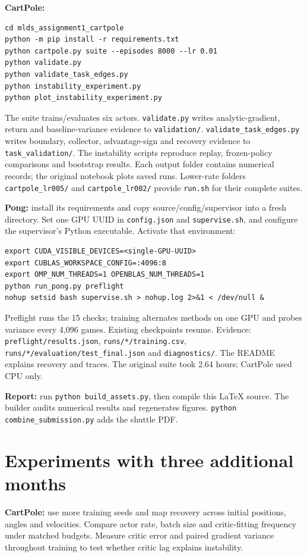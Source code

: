 \documentclass[11pt,letterpaper]{article}
\begin{document}
\textbf{CartPole:}
\begin{verbatim}
cd mlds_assignment1_cartpole
python -m pip install -r requirements.txt
python cartpole.py suite --episodes 8000 --lr 0.01
python validate.py
python validate_task_edges.py
python instability_experiment.py
python plot_instability_experiment.py
\end{verbatim}
The suite trains/evaluates six actors. \texttt{validate.py} writes analytic-gradient, return and baseline-variance evidence to \texttt{validation/}. \texttt{validate\_task\_edges.py} writes boundary, collector, advantage-sign and recovery evidence to \texttt{task\_validation/}. The instability scripts reproduce replay, frozen-policy comparisons and bootstrap results. Each output folder contains numerical records; the original notebook plots saved runs. Lower-rate folders \texttt{cartpole\_lr005/} and \texttt{cartpole\_lr002/} provide \texttt{run.sh} for their complete suites.

\textbf{Pong:} install its requirements and copy source/config/supervisor into a fresh directory. Set one GPU UUID in \texttt{config.json} and \texttt{supervise.sh}, and configure the supervisor's Python executable. Activate that environment:
\begin{verbatim}
export CUDA_VISIBLE_DEVICES=<single-GPU-UUID>
export CUBLAS_WORKSPACE_CONFIG=:4096:8
export OMP_NUM_THREADS=1 OPENBLAS_NUM_THREADS=1
python run_pong.py preflight
nohup setsid bash supervise.sh > nohup.log 2>&1 < /dev/null &
\end{verbatim}
Preflight runs the 15 checks; training alternates methods on one GPU and probes variance every 4,096 games. Existing checkpoints resume. Evidence: \texttt{preflight/results.json}, \texttt{runs/*/training.csv}, \texttt{runs/*/evaluation/test\_final.json} and \texttt{diagnostics/}. The README explains recovery and traces. The original suite took 2.64 hours; CartPole used CPU only.

\textbf{Report:} run \texttt{python build\_assets.py}, then compile this \LaTeX{} source. The builder audits numerical results and regenerates figures. \texttt{python combine\_submission.py} adds the shuttle PDF.

\section{Experiments with three additional months}
\textbf{CartPole:} use more training seeds and map recovery across initial positions, angles and velocities. Compare actor rate, batch size and critic-fitting frequency under matched budgets. Measure critic error and paired gradient variance throughout training to test whether critic lag explains instability.
\end{document}
